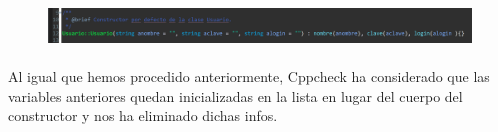 			\begin{figure}[H]
				\centering
				\includegraphics[scale=0.55]{img/esteban29.png}
				\label{esteban29}
			\end{figure}
		
			\paragraph{}Al igual que hemos procedido anteriormente, Cppcheck ha considerado que las variables anteriores quedan inicializadas en la lista en lugar del cuerpo del constructor y nos ha eliminado dichas infos.
\newpage